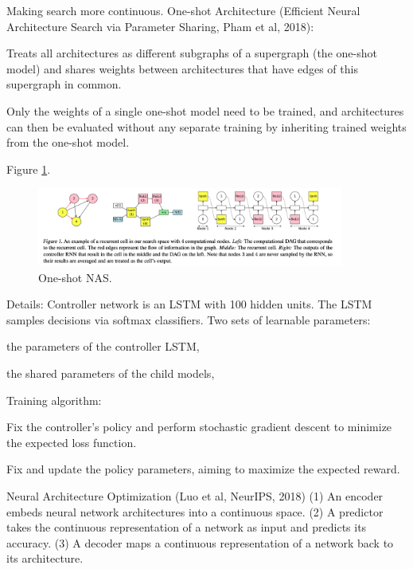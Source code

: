 \documentclass[english]{article}
\begin{document}
\item Making search more continuous. One-shot Architecture (Efficient Neural Architecture Search via Parameter Sharing, Pham et al, 2018):

Treats all architectures as different subgraphs of a supergraph (the one-shot model) and shares weights between architectures that have edges of this supergraph in common.


Only the weights of a single one-shot model need to be trained, and architectures can then be evaluated without any separate training by inheriting trained weights from the one-shot model.

\item 
Figure \ref{nas10}.


\begin{figure}[h!]
  \centering
  \includegraphics[width=0.9\textwidth]{nas10.png}
  \caption{One-shot NAS.}
  \label{nas10}
\end{figure}

\item Details: 
Controller network is an LSTM with 100 hidden units. The LSTM samples decisions via softmax classifiers. Two sets of learnable parameters:
\benum 
\item 
 the parameters of the controller LSTM, 
 \item
  the shared parameters of the child models, 
\eenum 

Training algorithm: 
\benum 
\item 
Fix the controller's policy and perform stochastic gradient descent  to minimize the expected loss function.
 \item
Fix  and update the policy parameters, aiming to maximize the expected reward.
\eenum 



\eenum 

\item Neural Architecture Optimization (Luo et al, NeurIPS, 2018) (1) An encoder embeds
neural network architectures into a continuous space. (2) A predictor takes the
continuous representation of a network as input and predicts its accuracy. (3) A
decoder maps a continuous representation of a network back to its architecture.
\end{document}
